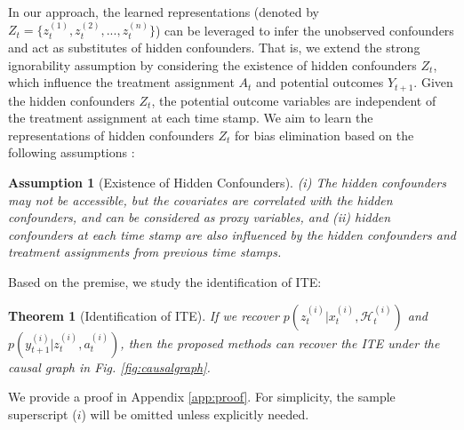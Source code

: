 \documentclass[journal]{IEEEtran}
\newtheorem{theorem}{Theorem}
\newtheorem{assumption}{Assumption}[section]
\begin{document}
In our approach, the learned representations (denoted by $Z_{t}=\{z^{(1)}_{t},z^{(2)}_{t},...,z^{(n)}_{t}\}$) can be leveraged to infer the unobserved confounders and act as substitutes of hidden confounders. %
That is, we extend the strong ignorability assumption by considering the existence of hidden confounders $Z_{t}$, which influence the treatment assignment $A_t$ and potential outcomes $Y_{t+1}$. 
Given the hidden confounders $Z_{t}$, the potential outcome variables are independent of the treatment assignment at each time stamp. 
We aim to learn the representations of hidden confounders $Z_{t}$ for bias elimination based on the following assumptions \cite{ma2021deconfounding}: 

\begin{assumption}[Existence of Hidden Confounders]\label{as:hiddenconfounders}
(i) The hidden confounders may not be accessible, but the covariates are correlated with the hidden confounders, and can be considered as proxy variables, and
(ii) hidden confounders at each time stamp are also influenced by the hidden confounders and treatment assignments from previous time stamps.
\end{assumption}

Based on the premise, we study the identification of ITE: 
\setcounter{theorem}{0}
\begin{theorem}[Identification of ITE]\label{thm:identification}
If we recover $p(z_t^{(i)}|x_t^{(i)},\mathcal{H}_t^{(i)})$ and $p(y_{t+1}^{(i)}|z_t^{(i)},a_t^{(i)})$, then the proposed methods can recover the ITE under the causal graph in Fig. \ref{fig:causalgraph}.
\end{theorem}
\noindent We provide a proof in Appendix \ref{app:proof}.
For simplicity, the sample superscript ($i$) will be omitted unless explicitly needed.
\end{document}
